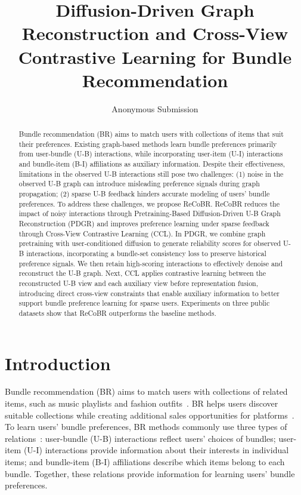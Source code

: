 \documentclass[letterpaper]{article}
\title{Diffusion-Driven Graph Reconstruction and Cross-View Contrastive Learning for Bundle Recommendation}
\author{
Anonymous Submission
}
\begin{document}
\maketitle


\begin{abstract}
Bundle recommendation (BR) aims to match users with collections of items that suit their preferences. Existing graph-based methods learn bundle preferences primarily from user-bundle (U-B) interactions, while incorporating user-item (U-I) interactions and bundle-item (B-I) affiliations as auxiliary information. Despite their effectiveness, limitations in the observed U-B interactions still pose two challenges: (1) noise in the observed U-B graph can introduce misleading preference signals during graph propagation; (2) sparse U-B feedback hinders accurate modeling of users' bundle preferences. To address these challenges, we propose ReCoBR. ReCoBR reduces the impact of noisy interactions through Pretraining-Based Diffusion-Driven U-B Graph Reconstruction (PDGR) and improves preference learning under sparse feedback through Cross-View Contrastive Learning (CCL). In PDGR, we combine graph pretraining with user-conditioned diffusion to generate reliability scores for observed U-B interactions, incorporating a bundle-set consistency loss to preserve historical preference signals. We then retain high-scoring interactions to effectively denoise and reconstruct the U-B graph. Next, CCL applies contrastive learning between the reconstructed U-B view and each auxiliary view before representation fusion, introducing direct cross-view constraints that enable auxiliary information to better support bundle preference learning for sparse users. Experiments on three public datasets show that ReCoBR outperforms the baseline methods.
\end{abstract}


\section{Introduction}

Bundle recommendation (BR) aims to match users with collections of related items, such as music playlists and fashion outfits~\cite{chen2019dam,ma2022crosscbr}. BR helps users discover suitable collections while creating additional sales opportunities for platforms~\cite{ma2022crosscbr,ma2024multicbr}. To learn users' bundle preferences, BR methods commonly use three types of relations~\cite{ma2022crosscbr,ma2024multicbr}: user-bundle (U-B) interactions reflect users' choices of bundles; user-item (U-I) interactions provide information about their interests in individual items; and bundle-item (B-I) affiliations describe which items belong to each bundle. Together, these relations provide information for learning users' bundle preferences.
\end{document}
